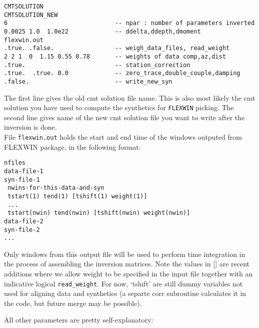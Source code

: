 \documentclass[12pt,titlepage,fleqn]{article}
\begin{document}
\begin{verbatim}
CMTSOLUTION
CMTSOLUTION_NEW
6                              -- npar : number of parameters inverted
0.0025 1.0  1.0e22             -- ddelta,ddepth,dmoment
flexwin.out
.true. .false.                 -- weigh_data_files, read_weight
2 2 1  0  1.15 0.55 0.78       -- weights of data comp,az,dist
.true.                         -- station_correction
.true.  .true. 0.0             -- zero_trace,double_couple,damping
.false.                        -- write_new_syn
\end{verbatim}
The first line gives the old cmt solution file name. This is also most likely the cmt solution you have used to compute the synthetics for \verb=FLEXWIN= picking. The second line gives name of the new cmt solution file you want to write after the inversion is done.\\
File \verb=flexwin.out= holds the start and end time of the windows outputed from FLEXWIN package, in the following format:

\begin{verbatim}
nfiles
data-file-1
syn-file-1
 nwins-for-this-data-and-syn
 tstart(1) tend(1) [tshift(1) weight(1)]
 ...
 tstart(nwin) tend(nwin) [tshift(nwin) weight(nwin)]
data-file-2
syn-file-2
...
\end{verbatim}
Only windows from this output file will be used to perform time integration in the process of assembling the inversion matrices. Note the values in [] are recent additions where we allow weight to be specified in the input file together with an indicative logical \verb+read_weight+. For now, `tshift' are still dummy variables not used for aligning data and synthetics (a separte corr subroutine calculates it in the code, but future merge may be possible).

All other parameters are pretty self-explanatory:
\end{document}
